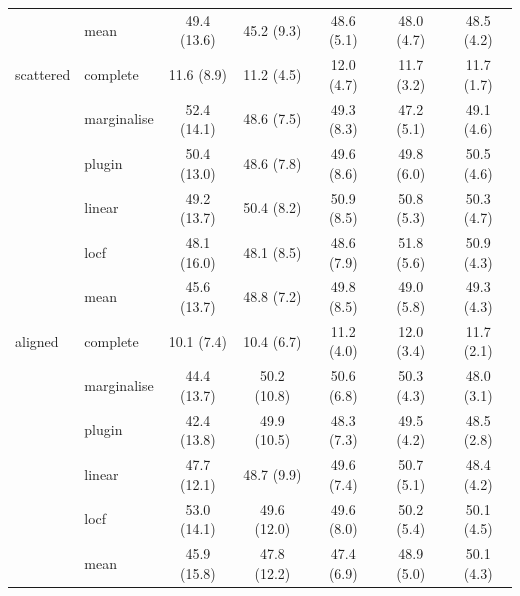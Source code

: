 \begin{table}[htbp]
\begin{tabular}{llccccc}
     & mean & 49.4 (13.6) & 45.2 (9.3) & 48.6 (5.1) & 48.0 (4.7) & 48.5 (4.2) \\
    \addlinespace
    scattered & complete & 11.6 (8.9) & 11.2 (4.5) & 12.0 (4.7) & 11.7 (3.2) & 11.7 (1.7) \\
     & marginalise & 52.4 (14.1) & 48.6 (7.5) & 49.3 (8.3) & 47.2 (5.1) & 49.1 (4.6) \\
     & plugin & 50.4 (13.0) & 48.6 (7.8) & 49.6 (8.6) & 49.8 (6.0) & 50.5 (4.6) \\
     & linear & 49.2 (13.7) & 50.4 (8.2) & 50.9 (8.5) & 50.8 (5.3) & 50.3 (4.7) \\
     & locf & 48.1 (16.0) & 48.1 (8.5) & 48.6 (7.9) & 51.8 (5.6) & 50.9 (4.3) \\
     & mean & 45.6 (13.7) & 48.8 (7.2) & 49.8 (8.5) & 49.0 (5.8) & 49.3 (4.3) \\
    \addlinespace
    aligned & complete & 10.1 (7.4) & 10.4 (6.7) & 11.2 (4.0) & 12.0 (3.4) & 11.7 (2.1) \\
     & marginalise & 44.4 (13.7) & 50.2 (10.8) & 50.6 (6.8) & 50.3 (4.3) & 48.0 (3.1) \\
     & plugin & 42.4 (13.8) & 49.9 (10.5) & 48.3 (7.3) & 49.5 (4.2) & 48.5 (2.8) \\
     & linear & 47.7 (12.1) & 48.7 (9.9) & 49.6 (7.4) & 50.7 (5.1) & 48.4 (4.2) \\
     & locf & 53.0 (14.1) & 49.6 (12.0) & 49.6 (8.0) & 50.2 (5.4) & 50.1 (4.5) \\
     & mean & 45.9 (15.8) & 47.8 (12.2) & 47.4 (6.9) & 48.9 (5.0) & 50.1 (4.3) \\
    \bottomrule
  \end{tabular}
\end{table}
